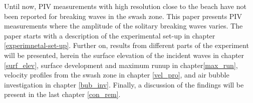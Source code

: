 \documentclass[a4paper, 11pt, english, twoside, openright]{article}
\begin{document}



Until now, PIV measurements with high resolution close to the beach have not been reported for breaking waves in the swash zone. This paper presents PIV measurements where the amplitude of the solitary breaking waves varies. The paper starts with a description of the experimental set-up in chapter \ref{experimnetal-set-up}. Further on, results from different parts of the experiment will be presented, herein the surface elevation of the incident waves in chapter \ref{surf_elev}, surface development and maximum runup in chapter\ref{max_run}, velocity profiles from the swash zone in chapter \ref{vel_pro}, and air bubble investigation in chapter \ref{bub_inv}. Finally, a discussion of the findings will be present in the last chapter \ref{con_rem}.
\end{document}
